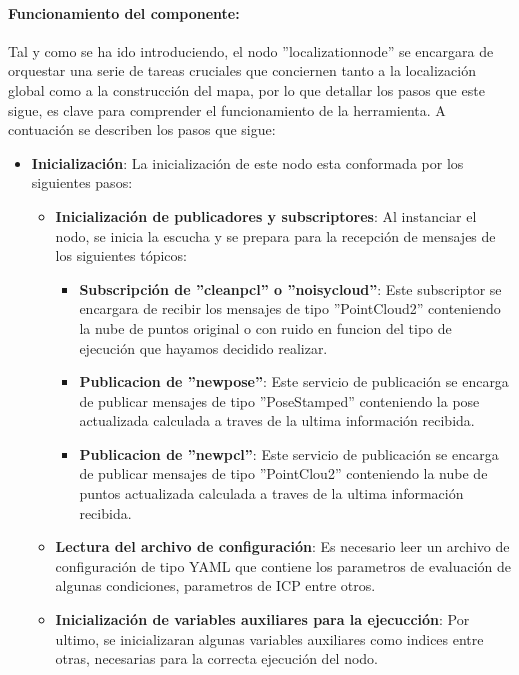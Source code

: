 \documentclass[12pt, a4paper, twoside]{article}
\begin{document}
\paragraph{Funcionamiento del componente:}
Tal y como se ha ido introduciendo, el nodo ''localization\textunderscore node'' se encargara de orquestar una serie de tareas cruciales que conciernen tanto 
a la localización global como a la construcción del mapa, por lo que detallar los pasos que este sigue, es clave para comprender el funcionamiento de la herramienta. 
A contuación se describen los pasos que sigue:
\begin{itemize}
  \item \textbf{Inicialización}: La inicialización de este nodo esta conformada por los siguientes pasos:
  \begin{itemize}
    \item \textbf{Inicialización de publicadores y subscriptores}: Al instanciar el nodo, se inicia la escucha y se prepara para la recepción de mensajes de los 
    siguientes tópicos:
    \begin{itemize}
      \item \textbf{Subscripción de ''clean\textunderscore pcl'' o ''noisy\textunderscore cloud''}: Este subscriptor se encargara de recibir los mensajes de tipo 
      ''PointCloud2'' conteniendo la nube de puntos original o con ruido en funcion del tipo de ejecución que hayamos decidido realizar.
      \item \textbf{Publicacion de ''new\textunderscore pose''}: Este servicio de publicación se encarga de publicar mensajes de tipo ''PoseStamped'' conteniendo 
      la pose actualizada calculada a traves de la ultima información recibida.
      \item \textbf{Publicacion de ''new\textunderscore pcl''}: Este servicio de publicación se encarga de publicar mensajes de tipo ''PointClou2'' conteniendo 
      la nube de puntos actualizada calculada a traves de la ultima información recibida.
    \end{itemize}
    \item \textbf{Lectura del archivo de configuración}: Es necesario leer un archivo de configuración de tipo YAML que contiene los parametros de evaluación de 
    algunas condiciones, parametros de ICP entre otros.
    \item \textbf{Inicialización de variables auxiliares para la ejecucción}: Por ultimo, se inicializaran algunas variables auxiliares como indices entre otras, necesarias 
    para la correcta ejecución del nodo.

\end{itemize}
\end{itemize}
\end{document}
